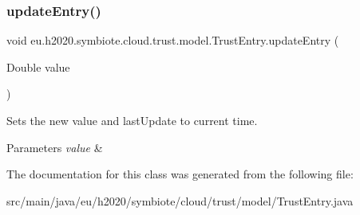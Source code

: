 \subsubsection{\texorpdfstring{update\+Entry()}{updateEntry()}}
{\footnotesize\ttfamily void eu.\+h2020.\+symbiote.\+cloud.\+trust.\+model.\+Trust\+Entry.\+update\+Entry (\begin{DoxyParamCaption}\item[{Double}]{value }\end{DoxyParamCaption})}

Sets the new value and last\+Update to current time.


\begin{DoxyParams}{Parameters}
{\em value} & \\
\hline
\end{DoxyParams}


The documentation for this class was generated from the following file\+:\begin{DoxyCompactItemize}
\item 
src/main/java/eu/h2020/symbiote/cloud/trust/model/Trust\+Entry.\+java\end{DoxyCompactItemize}
